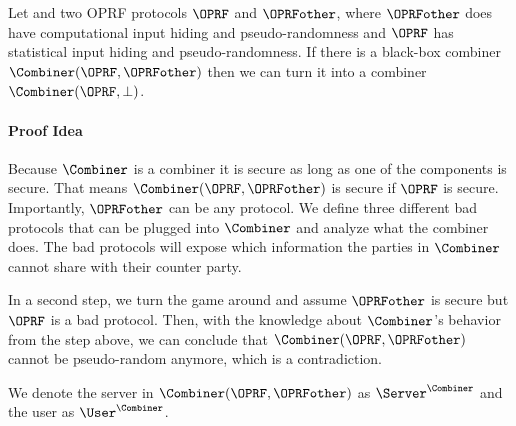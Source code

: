 
\begin{theorem}
    Let and two OPRF protocols $\OPRF$ and $\OPRFother$, where $\OPRFother$ does have computational input hiding and pseudo-randomness and $\OPRF$ has statistical input hiding and pseudo-randomness. 
    If there is a black-box combiner $\Combiner(\OPRF,\OPRFother)$ then we can turn it into a combiner $\Combiner(\OPRF,\bot)$.
\end{theorem}

\paragraph{Proof Idea}
 Because $\Combiner$ is a combiner it is secure as long as one of the components is secure.
 That means
 $\Combiner(\OPRF,\OPRFother)$ is secure if $\OPRF$ is secure. Importantly, $\OPRFother$ can be any protocol.
 We define three different bad protocols that can be plugged into $\Combiner$ and analyze what the combiner does.
 The bad protocols will expose which information the parties in $\Combiner$ cannot share with their counter party.

 In a second step, we turn the game around and assume $\OPRFother$ is secure but $\OPRF$ is a bad protocol. Then, with the knowledge about $\Combiner$'s behavior from the step above, we can
 conclude that $\Combiner(\OPRF,\OPRFother)$ cannot be pseudo-random anymore, which is a contradiction.

 We denote the server in $\Combiner(\OPRF,\OPRFother)$ as $\Server^\Combiner$ and the user as $\User^\Combiner$.

